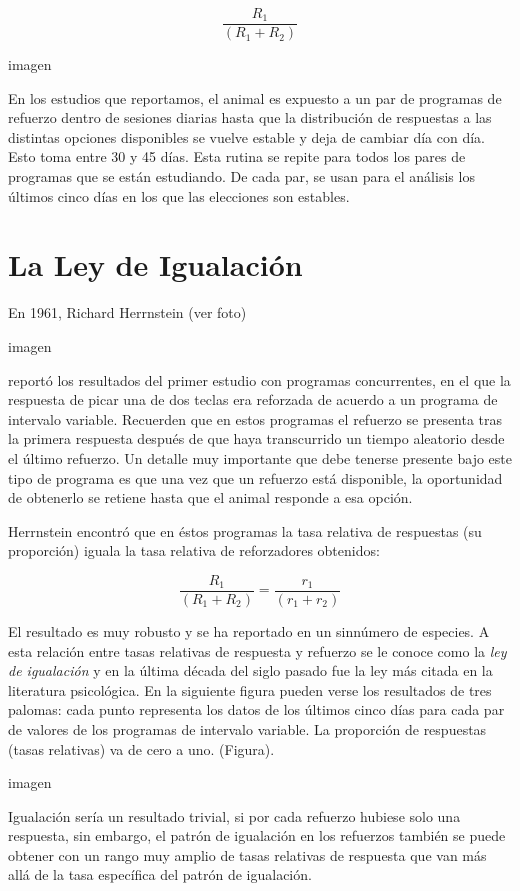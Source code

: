 \documentclass[
  letterpaper,
]{book}
\begin{document}
\[
\frac{R_1} {(R_1 +R_2)}
\]

imagen

En los estudios que reportamos, el animal es expuesto a un par de
programas de refuerzo dentro de sesiones diarias hasta que la
distribución de respuestas a las distintas opciones disponibles se
vuelve estable y deja de cambiar día con día. Esto toma entre 30 y 45
días. Esta rutina se repite para todos los pares de programas que se
están estudiando. De cada par, se usan para el análisis los últimos
cinco días en los que las elecciones son estables.

\section{La Ley de Igualación}\label{la-ley-de-igualaciuxf3n}

En 1961, Richard Herrnstein (ver foto)

imagen

reportó los resultados del primer estudio con programas concurrentes, en
el que la respuesta de picar una de dos teclas era reforzada de acuerdo
a un programa de intervalo variable. Recuerden que en estos programas el
refuerzo se presenta tras la primera respuesta después de que haya
transcurrido un tiempo aleatorio desde el último refuerzo. Un detalle
muy importante que debe tenerse presente bajo este tipo de programa es
que una vez que un refuerzo está disponible, la oportunidad de obtenerlo
se retiene hasta que el animal responde a esa opción.

Herrnstein encontró que en éstos programas la tasa relativa de
respuestas (su proporción) iguala la tasa relativa de reforzadores
obtenidos:

\[
\frac {R_1} {(R_1 + R_2)} = \frac {r_1} {(r_1 + r_2)}
\]

El resultado es muy robusto y se ha reportado en un sinnúmero de
especies. A esta relación entre tasas relativas de respuesta y refuerzo
se le conoce como la \emph{ley de igualación} y en la última década del
siglo pasado fue la ley más citada en la literatura psicológica. En la
siguiente figura pueden verse los resultados de tres palomas: cada punto
representa los datos de los últimos cinco días para cada par de valores
de los programas de intervalo variable. La proporción de respuestas
(tasas relativas) va de cero a uno. (Figura).

imagen

Igualación sería un resultado trivial, si por cada refuerzo hubiese solo
una respuesta, sin embargo, el patrón de igualación en los refuerzos
también se puede obtener con un rango muy amplio de tasas relativas de
respuesta que van más allá de la tasa específica del patrón de
igualación.
\end{document}
